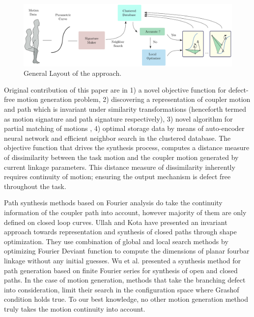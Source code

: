 \documentclass[twocolumn,10pt]{asme2e}
\begin{document}
\begin{figure}
\centering
\includegraphics[width=\textwidth]{figure/overall_approach.eps}
  \caption{General Layout of the approach.}
\label{overallMethod}
\end{figure}

Original contribution of this paper are in 1) a novel objective function for defect-free motion generation problem, 2) discovering a representation of coupler motion and path which is invariant under similarity transformations (henceforth termed as motion signature and path signature respectively), 3) novel algorithm for partial matching of motions , 4) optimal storage data by means of auto-encoder neural network and efficient neighbor search in the clustered database.
The objective function that drives the synthesis process, computes a distance measure of dissimilarity between the task motion and the coupler motion generated by current linkage parameters.
This distance measure of dissimilarity inherently requires continuity of motion; ensuring the output mechanism is defect free throughout the task.


Path synthesis methods based on Fourier analysis do take the continuity information of the coupler path into account, however majority of them are only defined on closed loop curves.
Ullah and Kota\cite{ullah1997} have presented an invariant approach towards representation and synthesis of closed paths through shape optimization. They use combination of global and local search methods by optimizing Fourier Deviant function to compute the dimensions of planar fourbar linkage without any initial guesses.
Wu et al.\cite{wu2011} presented a synthesis method for path generation based on finite Fourier series for synthesis of open and closed paths.
In the case of motion generation, methods that take the branching defect into consideration, limit their search in the configuration space where Grashof condition holds true.
To our best knowledge, no other motion generation method truly takes the motion continuity into account.
\end{document}
